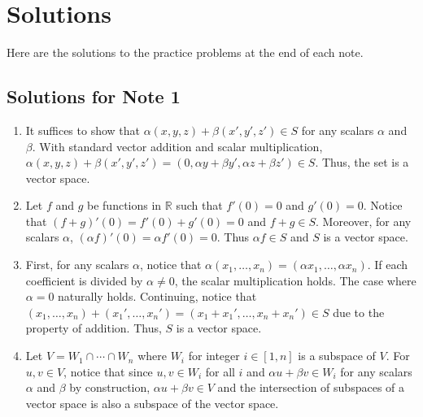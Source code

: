 \documentclass[../../../main.tex]{subfiles}
\begin{document}
\chapter{Solutions}

Here are the solutions to the practice problems at the end of each
note.

\section{Solutions for Note 1}
\begin{enumerate}
\item
It suffices to show that $\alpha (x, y, z) + \beta (x', y', z') \in S$
for any scalars $\alpha$ and $\beta$. With standard vector addition
and scalar multiplication, $\alpha (x, y, z) + \beta (x', y', z') =
(0, \alpha y + \beta y', \alpha z + \beta z') \in S$. Thus, the set
is a vector space.

\item
Let $f$ and $g$ be functions in $\mathbb{R}$ such that $f'(0) = 0$
and $g'(0) = 0$. Notice that $(f + g)'(0) = f'(0) + g'(0) = 0$ and
$f + g \in S$. Moreover, for any scalars $\alpha$, $(\alpha f)'(0)
= \alpha f'(0) = 0$. Thus $\alpha f \in S$ and $S$ is a vector
space.

\item
First, for any scalars $\alpha$, notice that $\alpha(x_1, \ldots, x_n)
= (\alpha x_1, \ldots, \alpha x_n)$. If each coefficient is divided
by $\alpha \neq 0$, the scalar multiplication holds. The case where
$\alpha = 0$ naturally holds. Continuing, notice that $(x_1, \ldots,
x_n) + (x_1', \ldots, x_n') = (x_1 + x_1', \ldots, x_n + x_n') \in S$
due to the property of addition. Thus, $S$ is a vector space.

\item
Let $V = W_1 \cap \cdots \cap W_n$ where $W_i$ for integer $i \in
[1, n]$ is a subspace of $V$. For $u, v \in V$, notice that since
$u, v \in W_i$ for all $i$ and $\alpha u + \beta v \in W_i$ for any
scalars $\alpha$ and $\beta$ by construction, $\alpha u + \beta v \in
V$ and the intersection of subspaces of a vector space is also a
subspace of the vector space.


\end{enumerate}
\end{document}
